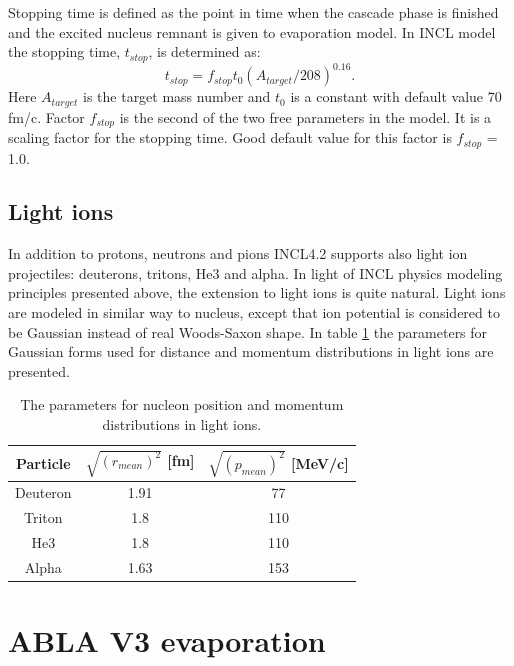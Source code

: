 Stopping time is defined as the point in time when the cascade phase is finished
and the excited nucleus remnant is given to evaporation model.
In INCL model the stopping time, $t_{stop}$,  is determined as:
\begin{equation}
t_{stop} = f_{stop}t_0 (A_{target}/208) ^{0.16}.
\end{equation}
Here $A_{target}$ is the target mass number and $t_0$ is a constant
with default value 70 fm/c. Factor $f_{stop}$ is the second of
the two free parameters in the model. It is a scaling factor for the
stopping time. Good default value for this factor is
$f_{stop}$ = 1.0.


\subsection{Light ions}

In addition to protons, neutrons and pions INCL4.2 supports also
light ion projectiles: deuterons, tritons, He3 and alpha.
In light of INCL physics modeling principles presented
above, the extension to light ions is quite natural. Light ions are
modeled in similar way to nucleus, except that ion potential is
considered to be Gaussian instead of real Woods-Saxon shape. In table
\ref{tbl:gaussianformslightions} the parameters for Gaussian forms
used for distance and momentum distributions in light ions are
presented.

\begin{table}[h]
\caption{The parameters for nucleon position and momentum
  distributions in light ions.} %
\begin{center}
\begin{tabular}{c|c c}
\hline
Particle & $\sqrt{(r_{mean})^2}$ [fm] & $\sqrt{(p_{mean})^2}$ [MeV/c]\\
\hline
Deuteron & 1.91 & 77 \\
Triton & 1.8 & 110 \\
He3 & 1.8 & 110 \\
Alpha & 1.63 & 153 \\
\hline
\end{tabular}
\end{center}
\label{tbl:gaussianformslightions}
\end{table}


\section{ABLA V3 evaporation}

